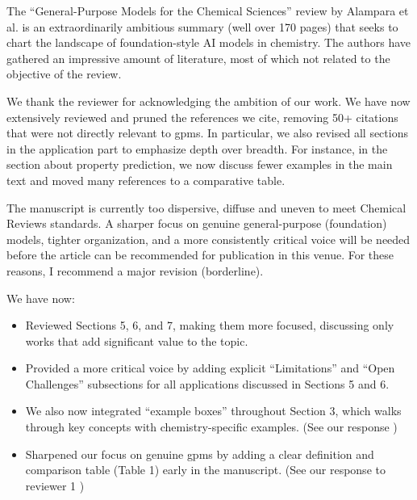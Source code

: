 
\begin{point}
The ``General-Purpose Models for the Chemical Sciences'' review by Alampara et al. is an extraordinarily ambitious summary (well over 170 pages) that seeks to chart the landscape of foundation-style AI models in chemistry. The authors have gathered an impressive amount of literature, most of which not related to the objective of the review.
\end{point}

\begin{reply}
\label{reply:depth_breadth}
We thank the reviewer for acknowledging the ambition of our work. We have now extensively reviewed and pruned the references we cite, removing 50+ citations that were not directly relevant to \glspl{gpm}. In particular, we also revised all sections in the application part to emphasize depth over breadth. For instance, in the section about property prediction, we now discuss fewer examples in the main text and moved many references to a comparative table. 
\end{reply}

\begin{point}
The manuscript is currently too dispersive, diffuse and uneven to meet Chemical Reviews standards. A sharper focus on genuine general-purpose (foundation) models, tighter organization, and a more consistently critical voice will be needed before the article can be recommended for publication in this venue. For these reasons, I recommend a major revision (borderline).
\end{point}

\begin{reply}
\label{reply:diffuse}
 We have now:
\begin{itemize}
\item Reviewed Sections 5, 6, and 7, making them more focused, discussing only works that add significant value to the topic.
\item Provided a more critical voice by adding explicit ``Limitations'' and ``Open Challenges'' subsections for all applications discussed in Sections 5 and 6.
\item We also now integrated \enquote{example boxes} throughout Section 3, which walks through key concepts with chemistry-specific examples. (See our response )
\item Sharpened our focus on genuine \glspl{gpm} by adding a clear definition and comparison table (Table 1) early in the manuscript. (See our response to reviewer 1 )
\end{itemize}
\end{reply}

